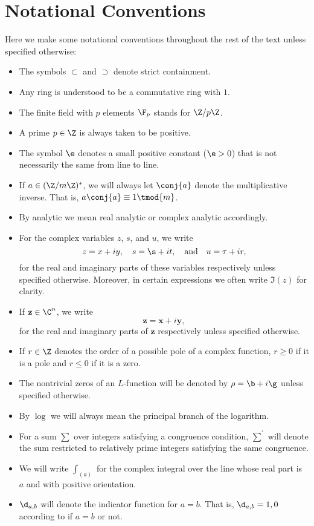   \section{Notational Conventions}
    Here we make some notational conventions throughout the rest of the text unless specified otherwise:
    \begin{itemize}
      \item The symbols $\subset$ and $\supset$ denote strict containment.
      \item Any ring is understood to be a commutative ring with $1$.
      \item The finite field with $p$ elements $\F_{p}$ stands for $\Z/p\Z$.
      \item A prime $p \in \Z$ is always taken to be positive.
      \item The symbol $\e$ denotes a small positive constant ($\e > 0$) that is not necessarily the same from line to line.
      \item If $a \in (\Z/m\Z)^{\ast}$, we will always let $\conj{a}$ denote the multiplicative inverse. That is, $a\conj{a} \equiv 1 \tmod{m}$.
      \item By analytic we mean real analytic or complex analytic accordingly.
      \item For the complex variables $z$, $s$, and $u$, we write
      \[
        z = x+iy, \quad s = \s+it, \quad \text{and} \quad u = \tau+ir,
      \]
      for the real and imaginary parts of these variables respectively unless specified otherwise. Moreover, in certain expressions we often write $\Im(z)$ for clarity.
      \item If $\mathbf{z} \in \C^{n}$, we write
      \[
        \mathbf{z} = \mathbf{x}+i\mathbf{y},
      \]
      for the real and imaginary parts of $\mathbf{z}$ respectively unless specified otherwise. 
      \item If $r \in \Z$ denotes the order of a possible pole of a complex function, $r \ge 0$ if it is a pole and $r \le 0$ if it is a zero.
      \item The nontrivial zeros of an $L$-function will be denoted by $\rho = \b+i\g$ unless specified otherwise.
      \item By $\log$ we will always mean the principal branch of the logarithm.
      \item For a sum $\sum$ over integers satisfying a congruence condition, $\sum^{'}$ will denote the sum restricted to relatively prime integers satisfying the same congruence.
      \item We will write $\int_{(a)}$ for the complex integral over the line whose real part is $a$ and with positive orientation.
      \item $\d_{a,b}$ will denote the indicator function for $a = b$. That is, $\d_{a,b} = 1,0$ according to if $a = b$ or not.
    \end{itemize}

